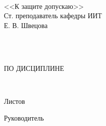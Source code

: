 \begin{ESKDtitlePage}
    \begin{center}
        \gpiMinEdu \\
        \gpiEdu \\
        \gpiKaf \\
    \end{center}

    \vfill

    \begin{flushright}
        \begin{minipage}[t]{.45\textwidth}
            <<К защите допускаю>> \\
            Ст. преподаватель кафедры ИИТ \\
            \underline{\hspace{3cm}} Е. В. Швецова \\
            \PageTitleDateField
        \end{minipage}
    \end{flushright}

    \vfill

    \begin{center}
        \textbf{\gpiTopic} \\
    \end{center}

    \vfill

    \begin{center}
        \gpiDocTopic \\
        ПО ДИСЦИПЛИНЕ \gpiDiscipline \\
    \end{center}

    \vfill

    \begin{center}
        \textbf{\gpiCode} \\
        
    \end{center}

    \begin{flushright}
        \begin{minipage}[t]{.45\textwidth}
            Листов \pageref{LastPage} \\
        \end{minipage}
    \end{flushright}

    \vfill

    \begin{flushright}
        \begin{minipage}[t]{.49\textwidth}
            \begin{minipage}[t]{.75\textwidth}
                \begin{flushright}
                    Руководитель


\end{flushright}
\end{minipage}
\end{minipage}
\end{flushright}
\end{ESKDtitlePage}
